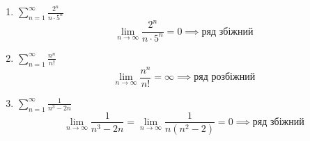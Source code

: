 \documentclass[../rgr_2.tex]{subfiles}
\begin{document}
\Solution

\begin{enumerate}
	\item $\sum_{n=1}^\infty \frac{2^n}{n\cdot5^n}$
	\begin{equation}
		\lim_{n\to\infty}\frac{2^n}{n\cdot5^n}=0
		\implies\text{ряд збіжний}
	\end{equation}

	\item $\sum_{n=1}^\infty \frac{n^n}{n!}$
	\begin{equation}
		\lim_{n\to\infty}\frac{n^n}{n!}=\infty
		\implies\text{ряд розбіжний}
	\end{equation}

	\item $\sum_{n=1}^\infty \frac{1}{n^3-2n}$
	\begin{equation}
		\lim_{n\to\infty}\frac{1}{n^3-2n}
		=\lim_{n\to\infty}\frac{1}{n(n^2-2)}
		=0
		\implies\text{ряд збіжний}
	\end{equation}
\end{enumerate}

\end{document}
